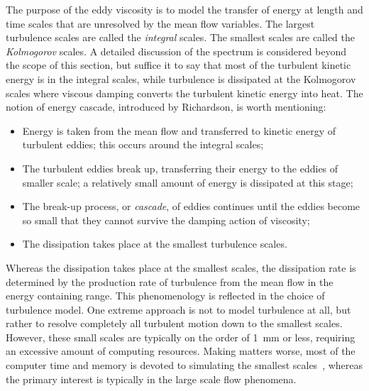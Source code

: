\documentclass[graybox]{svmult}
\begin{document}
The purpose of the eddy viscosity is to model the transfer of energy at length and time scales that are unresolved by the mean flow variables. The largest turbulence scales are called the {\em integral} scales. The smallest scales are called the {\em Kolmogorov} scales. A detailed discussion of the spectrum is considered beyond the scope of this section, but suffice it to say that most of the turbulent kinetic energy is in the integral scales, while turbulence is dissipated at the Kolmogorov scales where viscous damping converts the turbulent kinetic energy into heat. The notion of energy cascade, introduced by Richardson, is worth mentioning:
\begin{itemize}
\item Energy is taken from the mean flow and transferred to kinetic energy of turbulent eddies; this occurs around the integral scales;
\item The turbulent eddies break up, transferring their energy to the eddies of smaller scale; a relatively small amount of energy is dissipated at this stage;
\item The break-up process, or {\em cascade}, of eddies continues until the eddies become so small that they cannot survive the damping action of viscosity;
\item The dissipation takes place at the smallest turbulence scales.
\end{itemize}
Whereas the dissipation takes place at the smallest scales, the dissipation rate is determined by the production rate of turbulence from the mean flow in the energy containing range. This phenomenology is reflected in the choice of turbulence model. One extreme approach is not to model turbulence at all, but rather to resolve completely all turbulent motion down to the smallest scales. However, these small scales are typically on the order of 1~mm or less, requiring an excessive amount of computing resources. Making matters worse, most of the computer time and memory is devoted to simulating the smallest scales~\cite{Pope:2000}, whereas the primary interest is typically in the large scale flow phenomena.
\end{document}
